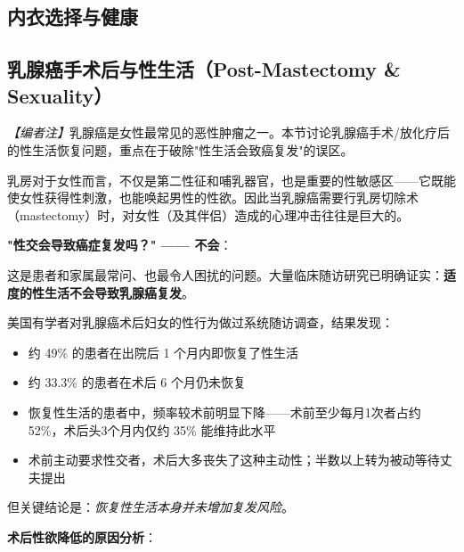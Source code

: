 \subsection{内衣选择与健康}
\subsection{乳腺癌手术后与性生活（Post-Mastectomy \& Sexuality）}

\noindent\textit{【编者注】}乳腺癌是女性最常见的恶性肿瘤之一。本节讨论乳腺癌手术/放化疗后的性生活恢复问题，重点在于破除"性生活会致癌复发"的误区。

\vspace{0.5em}
乳房对于女性而言，不仅是第二性征和哺乳器官，也是重要的性敏感区——它既能使女性获得性刺激，也能唤起男性的性欲。因此当乳腺癌需要行乳房切除术（mastectomy）时，对女性（及其伴侣）造成的心理冲击往往是巨大的。

\vspace{0.5em}
\noindent\textbf{"性交会导致癌症复发吗？" —— 不会}：

这是患者和家属最常问、也最令人困扰的问题。大量临床随访研究已明确证实：\textbf{适度的性生活不会导致乳腺癌复发}。

美国有学者对乳腺癌术后妇女的性行为做过系统随访调查，结果发现：
\begin{itemize}
	\item 约 49\% 的患者在出院后 1 个月内即恢复了性生活
	\item 约 33.3\% 的患者在术后 6 个月仍未恢复
	\item 恢复性生活的患者中，频率较术前明显下降——术前至少每月1次者占约 52\%，术后头3个月内仅约 35\% 能维持此水平
	\item 术前主动要求性交者，术后大多丧失了这种主动性；半数以上转为被动等待丈夫提出
\end{itemize}

但关键结论是：\textit{恢复性生活本身并未增加复发风险}。

\vspace{0.5em}
\noindent\textbf{术后性欲降低的原因分析}：

